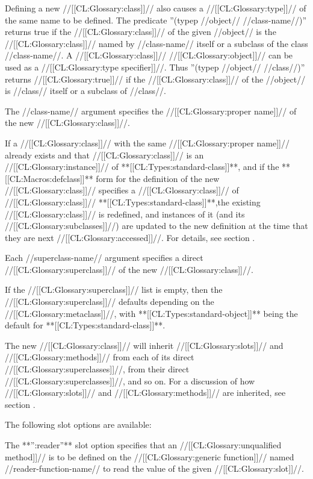 Defining a new //[[CL:Glossary:class]]// also causes a //[[CL:Glossary:type]]// of the same name to be defined. The predicate ''(typep //object// //class-name//)'' returns true if the //[[CL:Glossary:class]]// of the given //object// is the //[[CL:Glossary:class]]// named by //class-name// itself or a subclass of the class //class-name//. A //[[CL:Glossary:class]]// //[[CL:Glossary:object]]// can be used as a //[[CL:Glossary:type specifier]]//. Thus ''(typep //object// //class//)'' returns //[[CL:Glossary:true]]// if the //[[CL:Glossary:class]]// of the //object// is //class// itself or a subclass of //class//.

The //class-name// argument specifies the //[[CL:Glossary:proper name]]// of the new //[[CL:Glossary:class]]//.

If a //[[CL:Glossary:class]]// with the same //[[CL:Glossary:proper name]]// already exists and that //[[CL:Glossary:class]]// is an //[[CL:Glossary:instance]]// of **[[CL:Types:standard-class]]**, and if the **[[CL:Macros:defclass]]** form for the definition of the new //[[CL:Glossary:class]]// specifies a //[[CL:Glossary:class]]// of //[[CL:Glossary:class]]// **[[CL:Types:standard-class]]**,the existing //[[CL:Glossary:class]]// is redefined, and instances of it (and its //[[CL:Glossary:subclasses]]//) are updated to the new definition at the time that they are next //[[CL:Glossary:accessed]]//. For details, see section {\secref\ClassReDef}.


Each //superclass-name// argument specifies a direct //[[CL:Glossary:superclass]]// of the new //[[CL:Glossary:class]]//.

If the //[[CL:Glossary:superclass]]// list is empty, then the //[[CL:Glossary:superclass]]// defaults depending on the //[[CL:Glossary:metaclass]]//, with **[[CL:Types:standard-object]]** being the default for **[[CL:Types:standard-class]]**.

The new //[[CL:Glossary:class]]// will inherit //[[CL:Glossary:slots]]// and //[[CL:Glossary:methods]]// from each of its direct //[[CL:Glossary:superclasses]]//, from their direct //[[CL:Glossary:superclasses]]//, and so on. For a discussion of how //[[CL:Glossary:slots]]// and //[[CL:Glossary:methods]]// are inherited, see section {\secref\Inheritance}.



The following slot options are available:

\beginlist

\itemitem{\bull} The **'':reader''** slot option specifies that an //[[CL:Glossary:unqualified method]]// is to be defined on the //[[CL:Glossary:generic function]]// named //reader-function-name// to read the value of the given //[[CL:Glossary:slot]]//.

